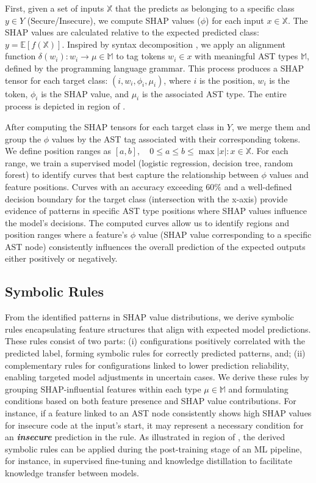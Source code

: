 First, given a set of inputs $\mathbb{X}$ that the \lcm predicts as belonging to a specific class $y \in Y$ (\eg Secure/Insecure), we compute SHAP values ($\phi$) for each input $x \in \mathbb{X}$. The SHAP values are calculated relative to the expected predicted class: $y = \mathbb{E}[f(\mathbb{X})]$. Inspired by syntax decomposition \cite{syntax_capabilities, palacio_towards_2024, docode}, we apply an alignment function $\delta(w_i): w_i \to \mu \in \mathbb{M}$ to tag tokens $w_i \in x$ with meaningful AST types $\mathbb{M}$, defined by the programming language grammar. This process produces a SHAP tensor for each target class: ${(i, w_i, \phi_i, \mu_i)}$, where $i$ is the position, $w_i$ is the token, $\phi_i$ is the SHAP value, and $\mu_i$ is the associated AST type. The entire process is depicted in region  of .

After computing the SHAP tensors for each target class in $Y$, we merge them and group the $\phi$ values by the AST tag associated with their corresponding tokens. We define position ranges as $[a, b], \quad 0 \leq a \leq b \leq \max{|x|: x \in \mathbb{X}}$. For each range, we train a supervised model (\eg logistic regression, decision tree, random forest) to identify curves that best capture the relationship between $\phi$ values and feature positions. Curves with an accuracy exceeding $60\%$ and a well-defined decision boundary for the target class (\ie intersection with the x-axis) provide evidence of patterns in specific AST type positions where SHAP values influence the model's decisions. The computed curves allow us to identify regions and position ranges where a feature’s $\phi$ value (\ie SHAP value corresponding to a specific AST node) consistently influences the overall prediction of the expected outputs either positively or negatively.

\subsection{Symbolic Rules}
From the identified patterns in SHAP value distributions, we derive symbolic rules encapsulating feature structures that align with expected model predictions. These rules consist of two parts: (i) configurations positively correlated with the predicted label, forming symbolic rules for correctly predicted patterns, and; (ii) complementary rules for configurations linked to lower prediction reliability, enabling targeted model adjustments in uncertain cases. We derive these rules by grouping SHAP-influential features within each type $\mu \in \mathbb{M}$ and formulating conditions based on both feature presence and SHAP value contributions. For instance, if a feature linked to an AST node consistently shows high SHAP values for insecure code at the input's start, it may represent a necessary condition for an \textbf{\textit{insecure}} prediction in the rule. As illustrated in region  of , the derived symbolic rules can be applied during the post-training stage of an ML pipeline, for instance, in supervised fine-tuning and knowledge distillation to facilitate knowledge transfer between models.
